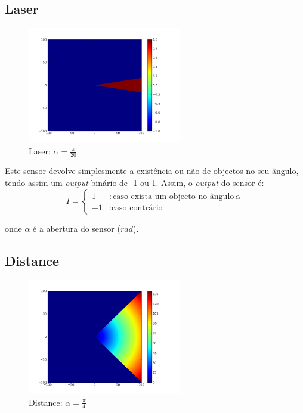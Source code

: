 \documentclass[a4paper]{article}
\begin{document}
\subsection{Laser}

\begin{figure}[h]
	\vspace{-20pt}
	\begin{center}
		\includegraphics[width=0.6\textwidth]{graphs/sensors/laser.png}
	\end{center}
	\vspace{-20pt}
	\caption{Laser: $\alpha=\frac{\pi}{20}$}
\end{figure}

\indent Este sensor devolve simplesmente a existência ou não de objectos no seu ângulo, tendo assim um \emph{output} binário de -1 ou 1.
Assim, o \emph{output} do sensor é:
\[
	I = \left\{
		\begin{array}{lr}
			1 & : \text{caso exista um objecto no ângulo}\, \alpha \\
			-1 & : \text{caso contrário}
		\end{array}
		\right.
\]

onde $\alpha$ é a abertura do sensor ($rad$).


\cleardoublepage
\subsection{Distance}

\begin{figure}[h]
	\vspace{-20pt}
	\begin{center}
		\includegraphics[width=0.6\textwidth]{graphs/sensors/distance.png}
	\end{center}
	\vspace{-20pt}
	\caption{Distance: $\alpha=\frac{\pi}{4}$}
\end{figure}
\end{document}
